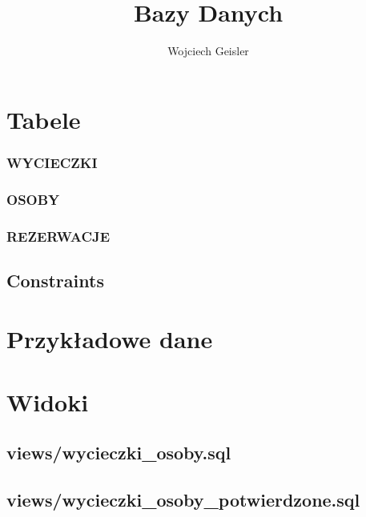 \documentclass[12pt]{article}
\begin{document}
\title{Bazy Danych}
\author{Wojciech Geisler}
\date{}
\maketitle

\tableofcontents

\clearpage

\section{Tabele}

\subsubsection{WYCIECZKI}


\subsubsection{OSOBY}


\subsubsection{REZERWACJE}


\subsection{Constraints}


\section{Przykładowe dane}


\section{Widoki}


\subsection{views/wycieczki\_osoby.sql}


\subsection{views/wycieczki\_osoby\_potwierdzone.sql}

\end{document}
